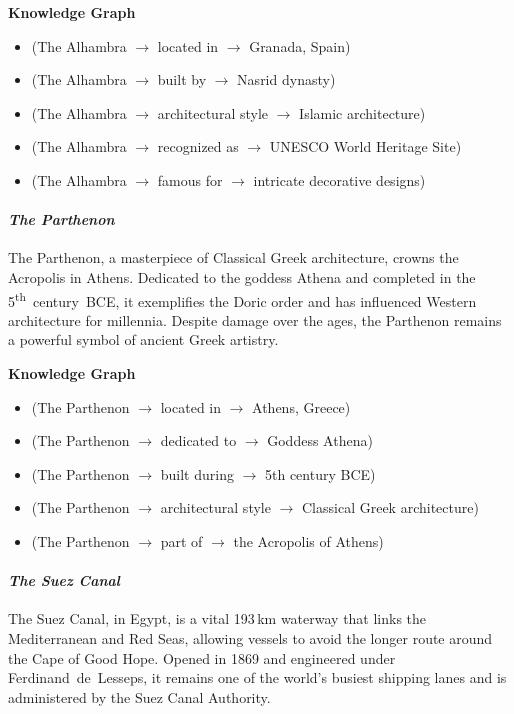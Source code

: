 \documentclass[11pt]{article}
\begin{document}
\textbf{Knowledge Graph}
\begin{itemize}[leftmargin=1em]
\item (The Alhambra $\rightarrow$ located in $\rightarrow$ Granada, Spain)
\item (The Alhambra $\rightarrow$ built by $\rightarrow$ Nasrid dynasty)
\item (The Alhambra $\rightarrow$ architectural style $\rightarrow$ Islamic architecture)
\item (The Alhambra $\rightarrow$ recognized as $\rightarrow$ UNESCO World Heritage Site)
\item (The Alhambra $\rightarrow$ famous for $\rightarrow$ intricate decorative designs)
\end{itemize}

\paragraph{\textit{The Parthenon}}
The Parthenon, a masterpiece of Classical Greek architecture, crowns the Acropolis in Athens.  Dedicated to the goddess Athena and completed in the 5\textsuperscript{th}~century~BCE, it exemplifies the Doric order and has influenced Western architecture for millennia.  Despite damage over the ages, the Parthenon remains a powerful symbol of ancient Greek artistry.

\textbf{Knowledge Graph}
\begin{itemize}[leftmargin=1em]
\item (The Parthenon $\rightarrow$ located in $\rightarrow$ Athens, Greece)
\item (The Parthenon $\rightarrow$ dedicated to $\rightarrow$ Goddess Athena)
\item (The Parthenon $\rightarrow$ built during $\rightarrow$ 5th century BCE)
\item (The Parthenon $\rightarrow$ architectural style $\rightarrow$ Classical Greek architecture)
\item (The Parthenon $\rightarrow$ part of $\rightarrow$ the Acropolis of Athens)
\end{itemize}

\paragraph{\textit{The Suez Canal}}
The Suez Canal, in Egypt, is a vital 193\,km waterway that links the Mediterranean and Red Seas, allowing vessels to avoid the longer route around the Cape of Good Hope.  Opened in 1869 and engineered under Ferdinand~de~Lesseps, it remains one of the world’s busiest shipping lanes and is administered by the Suez Canal Authority.
\end{document}
